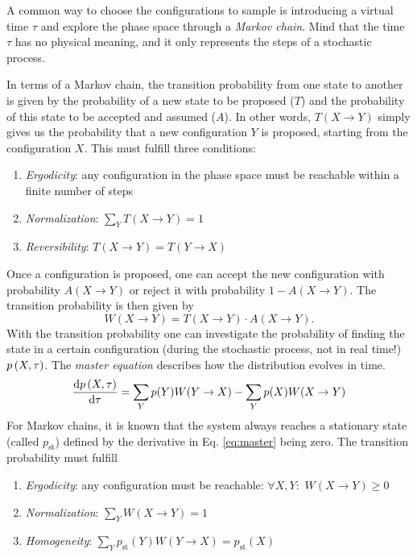A common way to choose the configurations to sample is introducing a virtual time $\tau$ and explore the phase space through a \emph{Markov chain}. Mind that the time $\tau$ has no physical meaning, and it only represents the steps of a stochastic process. 

In terms of a Markov chain, the transition probability from one state to another is given by the probability of a new state to be proposed ($T$) and the probability of this state to be accepted and assumed ($A$). In other words, $T(X\rightarrow Y)$ simply gives us the probability that a new configuration $Y$ is proposed, starting from the configuration $X$. This must fulfill three conditions:
\begin{enumerate}
\item \emph{Ergodicity}: any configuration in the phase space must be reachable within a finite number of steps
\item \emph{Normalization}: $\sum_Y{T(X\rightarrow Y)} =1$
\item \emph{Reversibility}:  $T(X\rightarrow Y)= T(Y\rightarrow X)$
\end{enumerate}
Once a configuration is proposed, one can accept the new configuration with probability $A(X\rightarrow Y)$ or reject it with probability $1- A(X\rightarrow Y)$. The transition probability is then given by
\begin{equation}
W(X\rightarrow Y) = T(X\rightarrow Y) \cdot A(X\rightarrow Y). 
\end{equation}
With the transition probability one can investigate the probability of finding the state in a certain configuration (during the stochastic process, not in real time!) $p\left(X,\tau\right)$. The \emph{master equation} describes how the distribution evolves in time. 
\begin{equation}
\frac{\text{d} p\left(X,\tau\right)}{\text{d} \tau}=\sum_Y{p(Y)W(Y\rightarrow X)}  -\sum_Y{p(X)W(X\rightarrow Y) }
\label{eq:master}
\end{equation}
For Markov chains, it is known that the system always reaches a stationary state (called $p_{\text{st}}$) defined by the derivative in Eq. \eqref{eq:master} being zero. The transition probability must fulfill
\begin{enumerate}
\item \emph{Ergodicity}: any configuration must be reachable: $\forall X,Y:$ $W(X\rightarrow Y)\ge0$
\item \emph{Normalization}: $\sum_Y{W(X\rightarrow Y)} =1$
\item \emph{Homogeneity}:  $\sum_Yp_{\text{st}}(Y)W(Y\rightarrow X)= p_{\text{st}}(X)$
\end{enumerate} 
 

